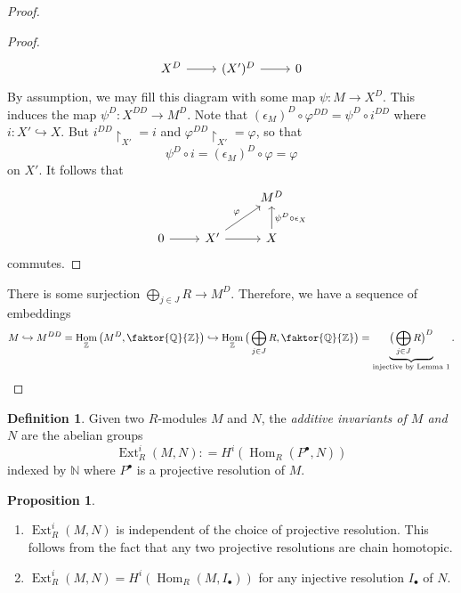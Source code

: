 \documentclass[10pt,letterpaper,cm]{nupset}
\theoremstyle{definition}
\newtheorem*{definition}{Definition}
\newtheorem{prop}{Proposition}
\newcommand{\N}{\mathbb N}
\newcommand{\Q}{\mathbb Q}
\newcommand{\Z}{\mathbb Z}
\newcommand{\1}{\mathbf{1}}
\newcommand{\0}{\vec 0}
\DeclareMathOperator{\ext}{Ext}
\DeclareMathOperator{\Hom}{Hom}
\begin{document}
\begin{proof}
\begin{proof}
\[\begin{tikzcd}
X^D \arrow[r] & (X')^D \arrow[r] & 0
\end{tikzcd}
\]
By assumption, we may fill this diagram with some map $\psi : M \to X^D$. This induces the map $\psi^D : X^{DD} \to M^D$. Note that $(\epsilon_M)^D \circ \varphi^{DD} = \psi^D \circ i^{DD}$ where $i : X' \hookrightarrow X$. But $i^{DD}\restriction_{X'} =i$ and $\varphi^{DD}\restriction_{X'} = \varphi$, so that $$\psi^D \circ i = (\epsilon_M)^D \circ  \varphi = \varphi$$ on $X'$. It follows that
\[
\begin{tikzcd}
 &  & M^D \\
0 \arrow[r] & X' \arrow[r] \arrow[ru, "\varphi"] & X \arrow[u, "\psi^D \circ \epsilon_X"']
\end{tikzcd}
\] commutes.
\end{proof}
There is some surjection $\bigoplus_{j\in J} R \to M^D$. Therefore, we have a sequence of embeddings $$M \hookrightarrow M^{DD} =\Hom_{\Z}\big (M^D, \faktor{\Q}{\Z} \big ) \hookrightarrow \Hom_{\Z}\big (\bigoplus_{j\in J} R, \faktor{\Q}{\Z}\big ) = \underbrace{\big (\bigoplus_{j\in J} R \big )^D}_{\text{injective by Lemma 1}}.$$
\end{proof}

\begin{definition}
Given two $R$-modules $M$ and $N$, the \textit{additive invariants of $M$ and $N$} are the abelian groups $$\ext^i_R (M, N): = H^i(\Hom_R(P^{\bullet}, N))$$ indexed by $\N$  where $P^{\bullet}$ is a projective resolution of $M$. 
\end{definition}

\begin{prop} $ $
\begin{enumerate}
\item $\ext^i_R(M, N)$ is independent of the choice of projective resolution. This follows from the fact that any two projective resolutions are chain homotopic.
\item $\ext^i_R(M, N) = H^i(\Hom_R(M, I_{\bullet}))$ for any injective resolution $I_{\bullet}$ of $N$.
\end{enumerate}
\end{prop}
\end{document}
